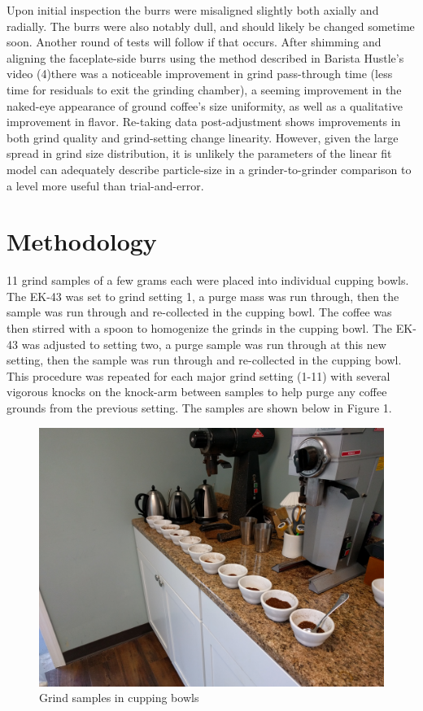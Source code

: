 \documentclass[10pt,a4paper,twocolumn,notitlepage]{article}
\begin{document}
Upon initial inspection the burrs were misaligned slightly both axially and radially. The burrs were also notably dull, and should likely be changed sometime soon. Another round of tests will follow if that occurs. After shimming and aligning the faceplate-side burrs using the method described in Barista Hustle's video (4)there was a noticeable improvement in grind pass-through time (less time for residuals to exit the grinding chamber), a seeming improvement in the naked-eye appearance of ground coffee's size uniformity, as well as a qualitative improvement in flavor. Re-taking data post-adjustment shows improvements in both grind quality and grind-setting change linearity. However, given the large spread in grind size distribution, it is unlikely the parameters of the linear fit model can adequately describe particle-size in a grinder-to-grinder comparison to a level more useful than trial-and-error.

\section{Methodology}
11 grind samples of a few grams each were placed into individual cupping bowls. The EK-43 was set to grind setting 1, a purge mass was run through, then the sample was run through and re-collected in the cupping bowl. The coffee was then stirred with a spoon to homogenize the grinds in the cupping bowl. The EK-43 was adjusted to setting two, a purge sample was run through at this new setting, then the sample was run through and re-collected in the cupping bowl. This procedure was repeated for each major grind setting (1-11) with several vigorous knocks on the knock-arm between samples to help purge any coffee grounds from the previous setting. The samples are shown below in Figure 1. 

\begin{center}\begin{figure}
 \includegraphics[width=\columnwidth]{preAdjustmentData/IMG_20190831_132715.jpg}
 \caption{Grind samples in cupping bowls}\label{fig:cuppingBowls}\end{figure} \end{center}
\end{document}

